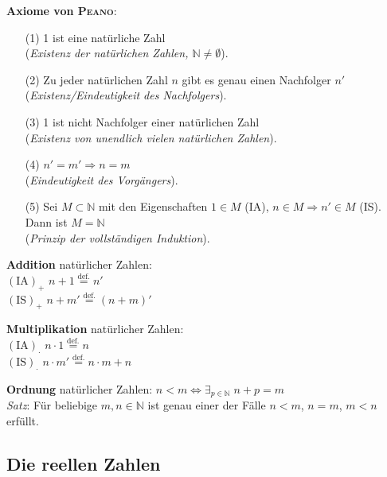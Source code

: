 \linie

\textbf{Axiome von \textsc{Peano}}:
\begin{itemize}
    \item[(1)] 1 ist eine natürliche Zahl \\
    (\emph{Existenz der natürlichen Zahlen, $\mathbb{N} \not= \emptyset$}).
    
    \item[(2)] Zu jeder natürlichen Zahl $n$ gibt es genau einen
    Nachfolger $n'$ \\
    (\emph{Existenz/Eindeutigkeit des Nachfolgers}).
    
    \item[(3)] 1 ist nicht Nachfolger einer natürlichen Zahl \\
    (\emph{Existenz von unendlich vielen natürlichen Zahlen}).
    
    \item[(4)] $n' = m' \Rightarrow n = m$ \\
    (\emph{Eindeutigkeit des Vorgängers}).
    
    \item[(5)] Sei $M \subset \mathbb{N}$ mit den Eigenschaften
    $1 \in M$ (IA), $n \in M \Rightarrow n' \in M$ (IS).
    Dann ist $M = \mathbb{N}$ \\
    (\emph{Prinzip der vollständigen Induktion}).
\end{itemize}

\linie

\textbf{Addition} natürlicher Zahlen: \\
$(\text{IA})_{\boldsymbol{+}}$ $n + 1 \overset{\text{def.}}{=} n'$ \\
$(\text{IS})_{\boldsymbol{+}}$ $n + m' \overset{\text{def.}}{=} (n + m)'$

\textbf{Multiplikation} natürlicher Zahlen: \\
$(\text{IA})_{\boldsymbol{\cdot}}$ $n \cdot 1 \overset{\text{def.}}{=} n$ \\
$(\text{IS})_{\boldsymbol{\cdot}}$ $n \cdot m' \overset{\text{def.}}{=}
n \cdot m + n$

\textbf{Ordnung} natürlicher Zahlen:
$n < m \Leftrightarrow \exists_{p \in \mathbb{N}}\; n + p = m$ \\
\emph{Satz}: Für beliebige $m, n \in \mathbb{N}$ ist genau einer der Fälle
$n < m$, $n = m$, $m < n$ erfüllt.

\pagebreak

\subsection{%
    Die reellen Zahlen%
}

